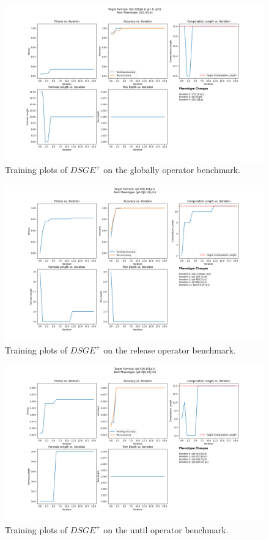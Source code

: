 \documentclass[runningheads]{llncs}
\begin{document}
\begin{figure}
    \centering
    \includegraphics[width=1.1\textwidth]{figs/log_global.txt.png}
    \caption{Training plots of $DSGE^+$ on the globally operator benchmark.}
    \label{fig:global}
\end{figure}

\begin{figure}
    \centering
    \includegraphics[width=1.1\textwidth]{figs/log_release.txt.png}
    \caption{Training plots of $DSGE^+$ on the release operator benchmark.}
    \label{fig:release}   
\end{figure}


\begin{figure}
    \centering
    \includegraphics[width=1.1\textwidth]{figs/log_until.txt.png}
    \caption{Training plots of $DSGE^+$ on the until operator benchmark.}
    \label{fig:until}
\end{figure}
\end{document}
